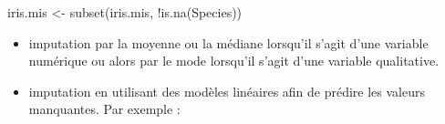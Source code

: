 \documentclass[
]{book}
\newenvironment{Shaded}{\begin{snugshade}}{\end{snugshade}}
\newcommand{\AttributeTok}[1]{\textcolor[rgb]{0.77,0.63,0.00}{#1}}
\newcommand{\ControlFlowTok}[1]{\textcolor[rgb]{0.13,0.29,0.53}{\textbf{#1}}}
\newcommand{\DecValTok}[1]{\textcolor[rgb]{0.00,0.00,0.81}{#1}}
\newcommand{\FunctionTok}[1]{\textcolor[rgb]{0.00,0.00,0.00}{#1}}
\newcommand{\NormalTok}[1]{#1}
\newcommand{\OtherTok}[1]{\textcolor[rgb]{0.56,0.35,0.01}{#1}}
\newcommand{\SpecialCharTok}[1]{\textcolor[rgb]{0.00,0.00,0.00}{#1}}
\newcommand{\StringTok}[1]{\textcolor[rgb]{0.31,0.60,0.02}{#1}}
\providecommand{\tightlist}{%
  \setlength{\itemsep}{0pt}\setlength{\parskip}{0pt}}
\theoremstyle{definition}
\theoremstyle{definition}
\theoremstyle{definition}
\theoremstyle{definition}
\theoremstyle{remark}
\begin{document}
\begin{Shaded}
\begin{Highlighting}[]
\NormalTok{iris.mis }\OtherTok{\textless{}{-}} \FunctionTok{subset}\NormalTok{(iris.mis, }\SpecialCharTok{!}\FunctionTok{is.na}\NormalTok{(Species))}
\end{Highlighting}
\end{Shaded}

\begin{itemize}
\tightlist
\item
  imputation par la moyenne ou la médiane lorsqu'il s'agit d'une variable numérique ou alors par le mode lorsqu'il s'agit d'une variable qualitative.
\end{itemize}

\begin{Shaded}
\end{Shaded}

\begin{itemize}
\tightlist
\item
  imputation en utilisant des modèles linéaires afin de prédire les valeurs manquantes. Par exemple :
\end{itemize}
\end{document}
